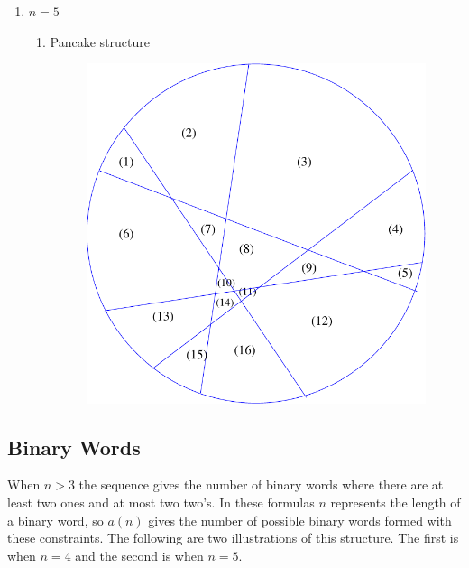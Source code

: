 \documentclass[a4paper,10pt]{article}
\begin{document}
\begin{enumerate}
  \item $n = 5$\\
  \begin{enumerate}
    \item Pancake structure\\
      \begin{figure}[h!]
			\includegraphics[scale=0.3]{graphics/pancakecut16}
			\captionsetup{labelformat=empty}
			\caption{}
			\label{fig:pancakecut16}
		\end{figure}
  \end{enumerate}
\end{enumerate}

\subsection{Binary Words}
When $n > 3$  the sequence gives the number of binary words where there are at least two ones and at most two two's. In these formulas $n$ represents the length of a binary word, so $a(n)$ gives the number of possible binary words formed with these constraints. The following are two illustrations of this structure. The first is when $n = 4$ and the second is when $n = 5$.
\end{document}
